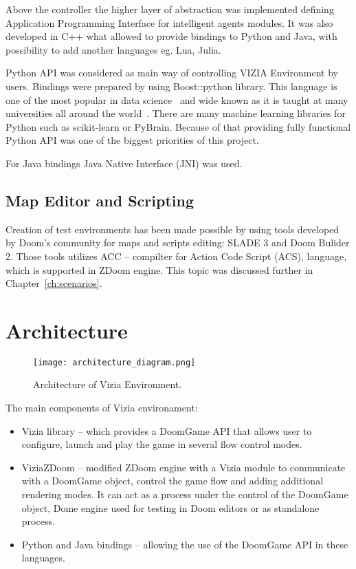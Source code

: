 Above the controller the higher layer of abstraction was implemented defining Application Programming Interface for intelligent agents modules.
It was also developed in C++ what allowed to provide bindings to Python and Java, with possibility to add another languages eg. Lua, Julia.


Python API was considered as main way of controlling VIZIA Environment by users.
Bindings were prepared by using Boost::python library.
This language is one of the most popular in data science~\cite{ds_lang} and wide known as it is taught at many universities all around the world~\cite{pythons_schools}.
There are many machine learning libraries for Python such as scikit-learn or PyBrain.
Because of that providing fully functional Python API was one of the biggest priorities of this project.


For Java bindings Java Native Interface (JNI) was used.


\subsection{Map Editor and Scripting}


Creation of test environments has been made possible by using tools developed by Doom's community for maps and scripts editing: SLADE 3 and Doom Bulider 2. Those tools utilizes ACC -- compilter for Action Code Script (ACS), language, which is supported in ZDoom engine.
This topic was discussed further in Chapter~\ref{ch:scenarios}.

\section{Architecture}\label{sec:architecture}
	\begin{figure}
			\centering
			\texttt{[image: architecture\_diagram.png]}
			\caption{Architecture of Vizia Environment.}\label{fig:architecture_diagram}
	\end{figure}

The main components of Vizia environament:
    \begin{itemize}
    \item Vizia library -- which provides a DoomGame API that allows user to configure, launch and play the game in several flow control modes.
    \item ViziaZDoom -- modified ZDoom engine with a Vizia module to communicate with a DoomGame object, control the game flow and adding additional rendering modes. It can act as a process under the control of the DoomGame object, Dome engine used for testing in Doom editors or as standalone process.
    \item Python and Java bindings -- allowing the use of the DoomGame API in these languages.
    \end{itemize}


